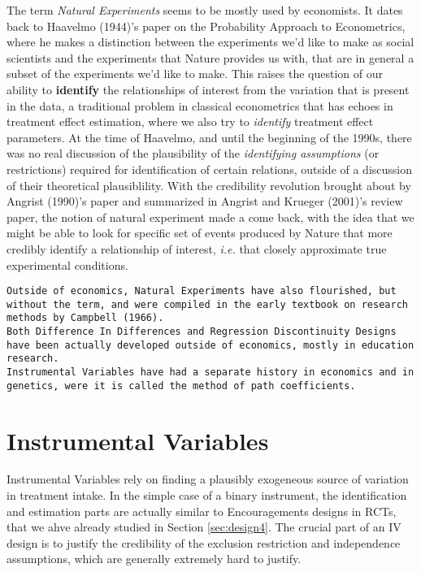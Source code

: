 \documentclass[]{book}
\theoremstyle{definition}
\theoremstyle{definition}
\theoremstyle{definition}
\theoremstyle{remark}
\let\BeginKnitrBlock\begin \let\EndKnitrBlock\end
\begin{document}
\BeginKnitrBlock{remark}
\iffalse{} {Remark. } \fi{}The term \emph{Natural Experiments} seems to
be mostly used by economists. It dates back to Haavelmo (1944)'s paper
on the Probability Approach to Econometrics, where he makes a
distinction between the experiments we'd like to make as social
scientists and the experiments that Nature provides us with, that are in
general a subset of the experiments we'd like to make. This raises the
question of our ability to \textbf{identify} the relationships of
interest from the variation that is present in the data, a traditional
problem in classical econometrics that has echoes in treatment effect
estimation, where we also try to \emph{identify} treatment effect
parameters. At the time of Haavelmo, and until the beginning of the
1990s, there was no real discussion of the plausibility of the
\emph{identifying assumptions} (or restrictions) required for
identification of certain relations, outside of a discussion of their
theoretical plausiblility. With the credibility revolution brought about
by Angrist (1990)'s paper and summarized in Angrist and Krueger (2001)'s
review paper, the notion of natural experiment made a come back, with
the idea that we might be able to look for specific set of events
produced by Nature that more credibly identify a relationship of
interest, \emph{i.e.} that closely approximate true experimental
conditions.
\EndKnitrBlock{remark}

\begin{verbatim}
Outside of economics, Natural Experiments have also flourished, but without the term, and were compiled in the early textbook on research methods by Campbell (1966).
Both Difference In Differences and Regression Discontinuity Designs have been actually developed outside of economics, mostly in education research.
Instrumental Variables have had a separate history in economics and in genetics, were it is called the method of path coefficients. 
\end{verbatim}

\section{Instrumental Variables}\label{instrumental-variables}

Instrumental Variables rely on finding a plausibly exogeneous source of
variation in treatment intake. In the simple case of a binary
instrument, the identification and estimation parts are actually similar
to Encouragements designs in RCTs, that we ahve already studied in
Section \ref{sec:design4}. The crucial part of an IV design is to
justify the credibility of the exclusion restriction and independence
assumptions, which are generally extremely hard to justify.
\end{document}
